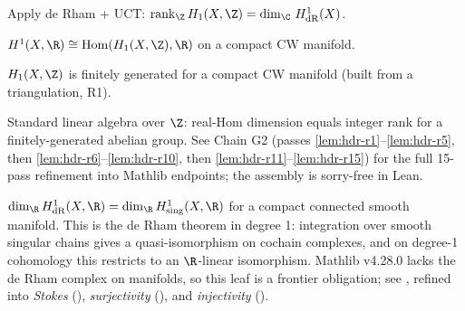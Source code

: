 \begin{lemma}
\label{lem:hodge-deRham-rank-eq-dim}
Apply de Rham + UCT: $\mathrm{rank}_{\Z}\,H_{1}(X, \Z) = \dim_{\C}\,H^{1}_{\mathrm{dR}}(X)$.
\leanok
\end{lemma}

\begin{lemma}
\label{lem:hodge-deRham-uct-degree-one}
$H^{1}(X, \R) \cong \mathrm{Hom}(H_{1}(X, \Z), \R)$ on a compact CW manifold.
\leanok
\end{lemma}

\begin{lemma}
\label{lem:hodge-deRham-h1-fg}
$H_{1}(X, \Z)$ is finitely generated for a compact CW manifold (built from a triangulation, R1).
\leanok
\end{lemma}

\begin{lemma}[Rank-Hom: $\dim_{\R}\,\mathrm{Hom}(A, \R) = \mathrm{rank}_{\Z}\,A$ for $A$ fg]
\label{lem:hodge-deRham-hom-rank}
Standard linear algebra over $\Z$: real-Hom dimension equals integer rank for a finitely-generated abelian group.  See Chain G2 (passes \ref{lem:hdr-r1}--\ref{lem:hdr-r5}, then \ref{lem:hdr-r6}--\ref{lem:hdr-r10}, then \ref{lem:hdr-r11}--\ref{lem:hdr-r15}) for the full 15-pass refinement into Mathlib endpoints; the assembly is sorry-free in Lean.
\leanok
\end{lemma}

\begin{lemma}
\label{lem:hodge-deRham-deRham-bridge}
$\dim_\R H^1_{\mathrm{dR}}(X, \R) = \dim_\R H^1_{\mathrm{sing}}(X, \R)$ for a compact connected smooth manifold.  This is the de Rham theorem in degree 1: integration over smooth singular chains gives a quasi-isomorphism on cochain complexes, and on degree-1 cohomology this restricts to an $\R$-linear isomorphism.  Mathlib v4.28.0 lacks the de Rham complex on manifolds, so this leaf is a frontier obligation; see , refined into \emph{Stokes} (), \emph{surjectivity} (), and \emph{injectivity} ().
\leanok
\end{lemma}

